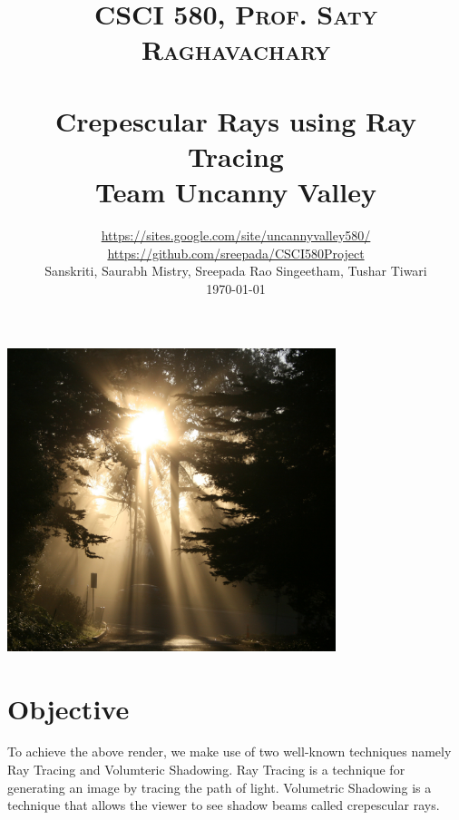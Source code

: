 \documentclass[paper=a4, fontsize=11pt]{scrartcl}
\title{
		\vspace{-1cm}
		\usefont{OT1}{bch}{b}{n}
		\normalfont \normalsize \textsc{CSCI 580, Prof. Saty Raghavachary} \\ [25pt]
		\horrule{0.4pt} \\[0.5cm]
		\huge\textbf{Crepescular Rays using Ray Tracing} \\
		\vspace{10pt}
		\normalsize\textbf{Team Uncanny Valley}
		\horrule{0.4pt} \\[0.5cm]
}
\author{
		\normalfont\normalsize
		\url{https://sites.google.com/site/uncannyvalley580/}\\[-3pt]\normalfont\normalsize
		\url{https://github.com/sreepada/CSCI580Project}\\[-3pt]\normalfont\normalsize
        Sanskriti, Saurabh Mistry, Sreepada Rao Singeetham, Tushar Tiwari\\[-3pt]		\normalsize
        \today
}
\date{}
\renewcommand{\headrulewidth}{0pt}			%
\renewcommand{\footrulewidth}{0pt}				%
\numberwithin{equation}{section}		%
\numberwithin{figure}{section}			%
\numberwithin{table}{section}				%
\begin{document}
\maketitle
\begin{center}\includegraphics[height=250pt]{crep1}\end{center}
\section{Objective}
To achieve the above render, we make use of two well-known techniques namely Ray Tracing and Volumteric Shadowing. Ray Tracing is a technique for generating an image by tracing the path of light. Volumetric Shadowing is a technique that allows the viewer to see shadow beams called crepescular rays.
\newpage
\tableofcontents
\newpage
\fancyhf{}
\fancyfoot[CE,CO]{\leftmark}
\fancyfoot[LE,RO]{\thepage}
\renewcommand{\headrulewidth}{1pt}
\renewcommand{\footrulewidth}{1pt}
\end{document}

